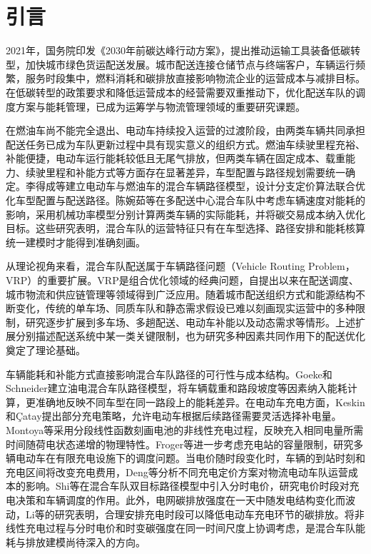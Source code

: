 \documentclass{setp-new}
\begin{document}
\maketitle

\section{引言}

2021年，国务院印发《2030年前碳达峰行动方案》，提出推动运输工具装备低碳转型，加快城市绿色货运配送发展\cite{ref:55}。城市配送连接仓储节点与终端客户，车辆运行频繁，服务时段集中，燃料消耗和碳排放直接影响物流企业的运营成本与减排目标。在低碳转型的政策要求和降低运营成本的经营需要双重推动下，优化配送车队的调度方案与能耗管理，已成为运筹学与物流管理领域的重要研究课题。

在燃油车尚不能完全退出、电动车持续投入运营的过渡阶段，由两类车辆共同承担配送任务已成为车队更新过程中具有现实意义的组织方式。燃油车续驶里程充裕、补能便捷，电动车运行能耗较低且无尾气排放，但两类车辆在固定成本、载重能力、续驶里程和补能方式等方面存在显著差异，车型配置与路径规划需要统一确定。李得成等\cite{ref:6}建立电动车与燃油车的混合车辆路径模型，设计分支定价算法联合优化车型配置与配送路径。陈婉茹等\cite{ref:23}在多配送中心混合车队中考虑车辆速度对能耗的影响，采用机械功率模型分别计算两类车辆的实际能耗，并将碳交易成本纳入优化目标。这些研究表明，混合车队的运营特征只有在车型选择、路径安排和能耗核算统一建模时才能得到准确刻画。

从理论视角来看，混合车队配送属于车辆路径问题（Vehicle Routing Problem，VRP）的重要扩展。VRP是组合优化领域的经典问题，自提出以来在配送调度、城市物流和供应链管理等领域得到广泛应用。随着城市配送组织方式和能源结构不断变化，传统的单车场、同质车队和静态需求假设已难以刻画现实运营中的多种限制，研究逐步扩展到多车场、多趟配送、电动车补能以及动态需求等情形。上述扩展分别描述配送系统中某一类关键限制，也为研究多种因素共同作用下的配送优化奠定了理论基础。

车辆能耗和补能方式直接影响混合车队路径的可行性与成本结构。Goeke和Schneider\cite{ref:27}建立油电混合车队路径模型，将车辆载重和路段坡度等因素纳入能耗计算，更准确地反映不同车型在同一路段上的能耗差异。在电动车充电方面，Keskin和Çatay\cite{ref:45}提出部分充电策略，允许电动车根据后续路径需要灵活选择补电量。Montoya等\cite{ref:montoya}采用分段线性函数刻画电池的非线性充电过程，反映充入相同电量所需时间随荷电状态递增的物理特性。Froger等\cite{ref:12}进一步考虑充电站的容量限制，研究多辆电动车在有限充电设施下的调度问题。当电价随时段变化时，车辆的到站时刻和充电区间将改变充电费用，Deng等\cite{ref:deng}分析不同充电定价方案对物流电动车队运营成本的影响。Shi等\cite{ref:93}在混合车队双目标路径模型中引入分时电价，研究电价时段对充电决策和车辆调度的作用。此外，电网碳排放强度在一天中随发电结构变化而波动，Li等\cite{ref:52}的研究表明，合理安排充电时段可以降低电动车充电环节的碳排放。将非线性充电过程与分时电价和时变碳强度在同一时间尺度上协调考虑，是混合车队能耗与排放建模尚待深入的方向。
\end{document}
